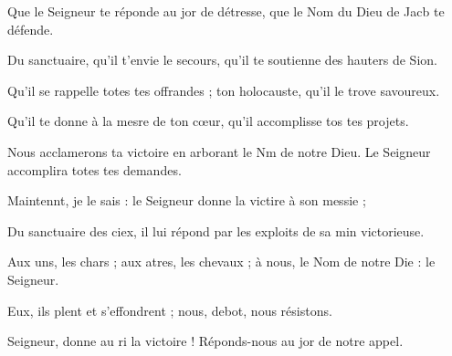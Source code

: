 \item Que le Seigneur te réponde au jor de détresse,\psstar{} que le Nom du Dieu de Jacb te défende.
\item Du sanctuaire, qu’il t’envie le secours,\psstar{} qu’il te soutienne des hauters de Sion.
\item Qu’il se rappelle totes tes offrandes ;\psstar{} ton holocauste, qu’il le trove savoureux.
\item Qu’il te donne à la mesre de ton cœur,\psstar{} qu’il accomplisse tos tes projets.
\item Nous acclamerons ta victoire en arborant le Nm de notre Dieu.\psstar{} Le Seigneur accomplira totes tes demandes.
\item Maintennt, je le sais :\psstar{} le Seigneur donne la victire à son messie ; 
\item Du sanctuaire des ciex, il lui répond\psstar{} par les exploits de sa min victorieuse.
\item Aux uns, les chars ; aux atres, les chevaux ;\psstar{} à nous, le Nom de notre Die : le Seigneur.
\item Eux, ils plent et s’effondrent ;\psstar{} nous, debot, nous résistons.
\item Seigneur, donne au ri la victoire !\psstar{} Réponds-nous au jor de notre appel.